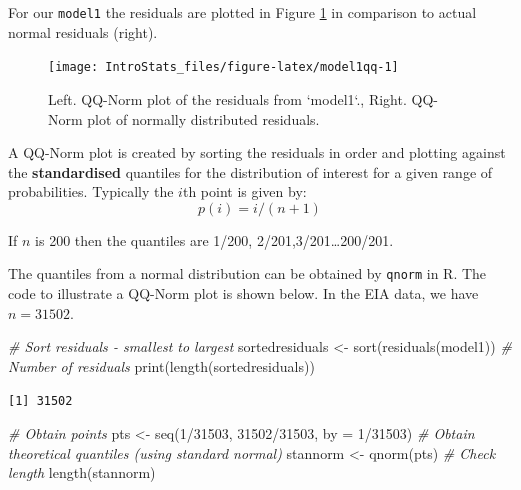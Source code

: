 \documentclass[
  oneside]{krantz}
\newenvironment{Shaded}{\begin{snugshade}}{\end{snugshade}}
\newcommand{\AttributeTok}[1]{\textcolor[rgb]{0.77,0.63,0.00}{#1}}
\newcommand{\CommentTok}[1]{\textcolor[rgb]{0.56,0.35,0.01}{\textit{#1}}}
\newcommand{\DecValTok}[1]{\textcolor[rgb]{0.00,0.00,0.81}{#1}}
\newcommand{\FunctionTok}[1]{\textcolor[rgb]{0.00,0.00,0.00}{#1}}
\newcommand{\NormalTok}[1]{#1}
\newcommand{\OtherTok}[1]{\textcolor[rgb]{0.56,0.35,0.01}{#1}}
\newcommand{\SpecialCharTok}[1]{\textcolor[rgb]{0.00,0.00,0.00}{#1}}
\begin{document}
For our \texttt{model1} the residuals are plotted in Figure \ref{fig:model1qq} in comparison to actual normal residuals (right).

\begin{figure}

{\centering \texttt{[image: IntroStats\_files/figure-latex/model1qq-1]} 

}

\caption{Left. QQ-Norm plot of the residuals from `model1`., Right. QQ-Norm plot of normally distributed residuals.}\label{fig:model1qq}
\end{figure}

A QQ-Norm plot is created by sorting the residuals in order and plotting against the \textbf{standardised} quantiles for the distribution of interest for a given range of probabilities. Typically the \(i\)th point is given by:
\[p(i) = i/(n+1)\]

If \(n\) is 200 then the quantiles are 1/200, 2/201,3/201\ldots200/201.

The quantiles from a normal distribution can be obtained by \texttt{qnorm} in R. The code to illustrate a QQ-Norm plot is shown below. In the EIA data, we have \(n = 31502\).

\begin{Shaded}
\begin{Highlighting}[]
\CommentTok{\# Sort residuals {-} smallest to largest}
\NormalTok{sortedresiduals }\OtherTok{\textless{}{-}} \FunctionTok{sort}\NormalTok{(}\FunctionTok{residuals}\NormalTok{(model1))}
\CommentTok{\# Number of residuals}
\FunctionTok{print}\NormalTok{(}\FunctionTok{length}\NormalTok{(sortedresiduals))}
\end{Highlighting}
\end{Shaded}

\begin{verbatim}
[1] 31502
\end{verbatim}

\begin{Shaded}
\begin{Highlighting}[]
\CommentTok{\# Obtain points }
\NormalTok{pts }\OtherTok{\textless{}{-}} \FunctionTok{seq}\NormalTok{(}\DecValTok{1}\SpecialCharTok{/}\DecValTok{31503}\NormalTok{, }\DecValTok{31502}\SpecialCharTok{/}\DecValTok{31503}\NormalTok{, }\AttributeTok{by =} \DecValTok{1}\SpecialCharTok{/}\DecValTok{31503}\NormalTok{)}
\CommentTok{\# Obtain theoretical quantiles (using standard normal)}
\NormalTok{stannorm }\OtherTok{\textless{}{-}} \FunctionTok{qnorm}\NormalTok{(pts)}
\CommentTok{\# Check length}
\FunctionTok{length}\NormalTok{(stannorm)}
\end{Highlighting}
\end{Shaded}
\end{document}

